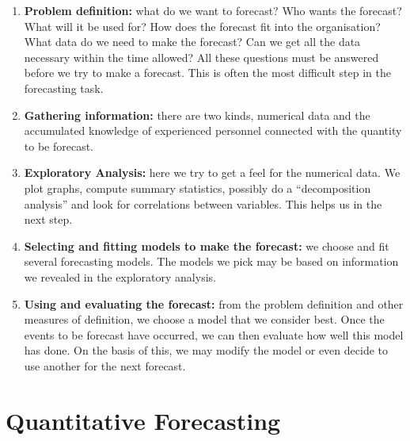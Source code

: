 \documentclass[a4paper,11pt,oneside,onecolumn]{book}
\begin{document}
\begin{enumerate}
\item \textbf{Problem definition:} what do we want to forecast? Who wants
the forecast? What will it be used for? How does the forecast fit
into the organisation? What data do we need to make the forecast?
Can we get all the data necessary within the time allowed? All these
questions must be answered before we try to make a forecast. This is
often the most difficult step in the forecasting task.

\item \textbf{Gathering information:} there are two kinds, numerical data
and the accumulated knowledge of experienced personnel connected
with the quantity to be forecast.

\item \textbf{Exploratory Analysis:} here we try to get a feel for the numerical data. We plot graphs,
compute summary statistics, possibly do a ``decomposition analysis''
and look for correlations between variables. This helps us in the
next step.
\item \textbf{Selecting and fitting models to make the forecast:} we choose
and fit several forecasting models. The models we pick may be based
on information we revealed in the exploratory analysis.

\item \textbf{Using and evaluating the forecast:} from the problem
definition and other measures of definition, we choose a model that
we consider best. Once the events to be forecast have occurred, we
can then evaluate how well this model has done. On the basis of
this, we may modify the model or even decide to use another for the
next forecast.
\end{enumerate}

\vspace{2cm}




\chapter{Quantitative Forecasting}
\end{document}

